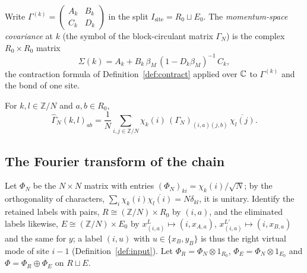\begin{definition}\label{def:symbol}
Write $\Gamma^{(k)}=\begin{pmatrix}A_k&B_k\\C_k&D_k\end{pmatrix}$ in the split
$I_{\mathrm{site}}=R_0\sqcup E_0$. The \emph{momentum-space covariance} at $k$ (the symbol of the
block-circulant matrix $\Gamma_N$) is the complex $R_0\times R_0$ matrix
\[
 \Sigma(k)=A_k+B_k\,\beta_M\,(1-D_k\beta_M)^{-1}\,C_k ,
\]
the contraction formula of Definition~\ref{def:contract} applied over $\mathbb C$ to $\Gamma^{(k)}$
and the bond of one site.
\end{definition}

\begin{definition}\label{def:fourier}
For $k,l\in\mathbb Z/N$ and $a,b\in R_0$,
\[
 \widehat{\Gamma}_N(k,l)_{ab}=\frac1N\sum_{i,j\in\mathbb Z/N}\chi_k(i)\,(\Gamma_N)_{(i,a)(j,b)}\,\overline{\chi_l(j)} .
\]
\end{definition}

\subsection{The Fourier transform of the chain}
Let $\Phi_N$ be the $N\times N$ matrix with entries $(\Phi_N)_{ki}=\chi_k(i)/\sqrt N$; by the
orthogonality of characters, $\sum_i\chi_k(i)\overline{\chi_l(i)}=N\delta_{kl}$, it is
unitary. Identify the retained labels with pairs, $R\cong(\mathbb Z/N)\times R_0$ by
$(i,a)$, and the eliminated labels likewise, $E\cong(\mathbb Z/N)\times E_0$ by
$x^{L}_{(i,a)}\mapsto(i,x_{A,a})$, $x^{L'}_{(i,a)}\mapsto(i,x_{B,a})$ and the same for $y$;
a label $(i,u)$ with $u\in\{x_B,y_B\}$ is thus the right virtual mode of site $i-1$
(Definition~\ref{def:input}). Let $\Phi_R=\Phi_N\otimes1_{R_0}$,
$\Phi_E=\Phi_N\otimes1_{E_0}$ and $\Phi=\Phi_R\oplus\Phi_E$ on $R\sqcup E$.


